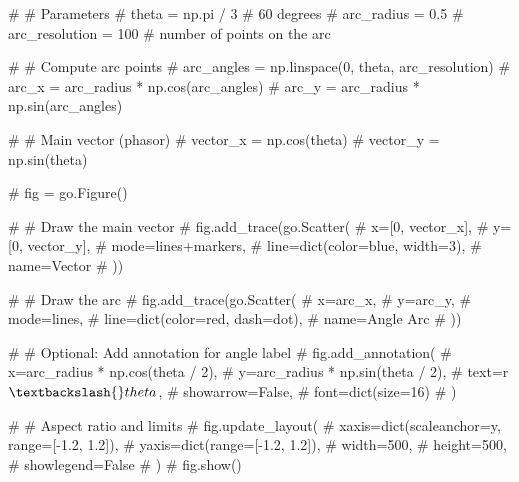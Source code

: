 \documentclass[
  letterpaper,
  DIV=11,
  numbers=noendperiod]{scrartcl}
\newenvironment{Shaded}{\begin{snugshade}}{\end{snugshade}}
\newcommand{\CommentTok}[1]{\textcolor[rgb]{0.37,0.37,0.37}{#1}}
\begin{document}
\begin{Shaded}
\begin{Highlighting}[]
\CommentTok{\# \# Parameters}
\CommentTok{\# theta = np.pi / 3  \# 60 degrees}
\CommentTok{\# arc\_radius = 0.5}
\CommentTok{\# arc\_resolution = 100  \# number of points on the arc}

\CommentTok{\# \# Compute arc points}
\CommentTok{\# arc\_angles = np.linspace(0, theta, arc\_resolution)}
\CommentTok{\# arc\_x = arc\_radius * np.cos(arc\_angles)}
\CommentTok{\# arc\_y = arc\_radius * np.sin(arc\_angles)}

\CommentTok{\# \# Main vector (phasor)}
\CommentTok{\# vector\_x = np.cos(theta)}
\CommentTok{\# vector\_y = np.sin(theta)}

\CommentTok{\# fig = go.Figure()}

\CommentTok{\# \# Draw the main vector}
\CommentTok{\# fig.add\_trace(go.Scatter(}
\CommentTok{\#     x=[0, vector\_x],}
\CommentTok{\#     y=[0, vector\_y],}
\CommentTok{\#     mode=\textquotesingle{}lines+markers\textquotesingle{},}
\CommentTok{\#     line=dict(color=\textquotesingle{}blue\textquotesingle{}, width=3),}
\CommentTok{\#     name=\textquotesingle{}Vector\textquotesingle{}}
\CommentTok{\# ))}

\CommentTok{\# \# Draw the arc}
\CommentTok{\# fig.add\_trace(go.Scatter(}
\CommentTok{\#     x=arc\_x,}
\CommentTok{\#     y=arc\_y,}
\CommentTok{\#     mode=\textquotesingle{}lines\textquotesingle{},}
\CommentTok{\#     line=dict(color=\textquotesingle{}red\textquotesingle{}, dash=\textquotesingle{}dot\textquotesingle{}),}
\CommentTok{\#     name=\textquotesingle{}Angle Arc\textquotesingle{}}
\CommentTok{\# ))}

\CommentTok{\# \# Optional: Add annotation for angle label}
\CommentTok{\# fig.add\_annotation(}
\CommentTok{\#     x=arc\_radius * np.cos(theta / 2),}
\CommentTok{\#     y=arc\_radius * np.sin(theta / 2),}
\CommentTok{\#     text=r\textquotesingle{}$\textbackslash{}theta$\textquotesingle{},}
\CommentTok{\#     showarrow=False,}
\CommentTok{\#     font=dict(size=16)}
\CommentTok{\# )}

\CommentTok{\# \# Aspect ratio and limits}
\CommentTok{\# fig.update\_layout(}
\CommentTok{\#     xaxis=dict(scaleanchor=\textquotesingle{}y\textquotesingle{}, range=[{-}1.2, 1.2]),}
\CommentTok{\#     yaxis=dict(range=[{-}1.2, 1.2]),}
\CommentTok{\#     width=500,}
\CommentTok{\#     height=500,}
\CommentTok{\#     showlegend=False}
\CommentTok{\# )}
\CommentTok{\# fig.show()}
\end{Highlighting}
\end{Shaded}
\end{document}
